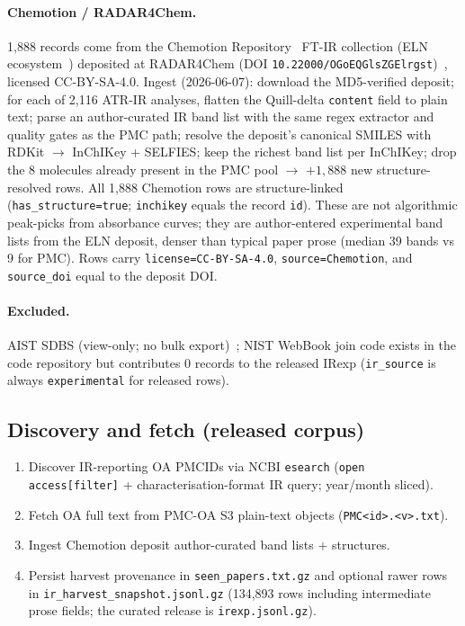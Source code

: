 \documentclass[pdflatex,sn-nature]{sn-jnl}
\begin{document}
\paragraph{Chemotion / RADAR4Chem.}
1,888 records come from the Chemotion Repository~\citep{tremouilhac2020chemotionrepo}
FT-IR collection (ELN ecosystem~\citep{tremouilhac2017chemotion}) deposited at
RADAR4Chem (DOI \texttt{10.22000/OGoEQGlsZGElrgst})~\citep{chemotion2024}, licensed
CC-BY-SA-4.0.
Ingest (2026-06-07): download the MD5-verified deposit; for each of 2,116
ATR-IR analyses, flatten the Quill-delta \texttt{content} field to plain text;
parse an author-curated IR band list with the same regex extractor and quality
gates as the PMC path; resolve the deposit's canonical SMILES with RDKit
$\to$ InChIKey + SELFIES; keep the richest band list per InChIKey; drop the 8
molecules already present in the PMC pool $\to$ $+1{,}888$ new structure-resolved
rows.
All 1,888 Chemotion rows are structure-linked (\texttt{has\_structure=true};
\texttt{inchikey} equals the record \texttt{id}).
These are not algorithmic peak-picks from absorbance curves; they are
author-entered experimental band lists from the ELN deposit, denser than typical
paper prose (median 39 bands vs 9 for PMC).
Rows carry \texttt{license=CC-BY-SA-4.0}, \texttt{source=Chemotion}, and
\texttt{source\_doi} equal to the deposit DOI.

\paragraph{Excluded.}
AIST SDBS (view-only; no bulk export)~\citep{sdbs}; NIST WebBook join code exists
in the code repository but contributes 0 records to the released IRexp
(\texttt{ir\_source} is always \texttt{experimental} for released rows).

\subsection{Discovery and fetch (released corpus)}

\begin{enumerate}
  \item Discover IR-reporting OA PMCIDs via NCBI \texttt{esearch}
        (\texttt{open access[filter]} + characterisation-format IR query;
        year/month sliced).
  \item Fetch OA full text from PMC-OA S3 plain-text objects
        (\texttt{PMC<id>.<v>.txt}).
  \item Ingest Chemotion deposit author-curated band lists + structures.
  \item Persist harvest provenance in \texttt{seen\_papers.txt.gz} and optional
        rawer rows in \texttt{ir\_harvest\_snapshot.jsonl.gz} (134,893 rows including
        intermediate prose fields; the curated release is \texttt{irexp.jsonl.gz}).
\end{enumerate}
\end{document}

